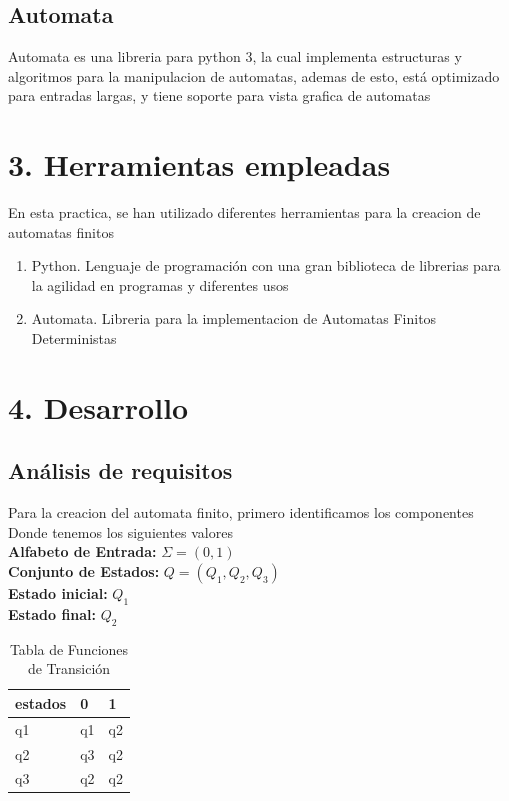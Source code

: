 \documentclass{article}
\begin{document}
    \subsection{Automata}
    Automata es una libreria para python 3, la cual implementa estructuras y algoritmos para la manipulacion de automatas, ademas de esto, está optimizado para entradas largas, y tiene soporte para vista grafica de automatas \cite{b4}
\section{3. Herramientas empleadas}
    En esta practica, se han utilizado diferentes herramientas para la creacion de automatas finitos
    \begin{enumerate}
        \item Python. Lenguaje de programación con una gran biblioteca de librerias para la agilidad en programas y diferentes usos \cite{b5}
        \item  Automata. Libreria para la implementacion de Automatas Finitos Deterministas \cite{b4}
    \end{enumerate}        
    \newpage
    
\section{4. Desarrollo}
    \subsection{Análisis de requisitos}
    Para la creacion del automata finito, primero identificamos los componentes \\
    Donde tenemos los siguientes valores \\
    \textbf{Alfabeto de Entrada:} \(\Sigma=(0,1)\) \\
    \textbf{Conjunto de Estados:} \(Q=(Q_1,Q_2,Q_3)\) \\
    \textbf{Estado inicial:} \(Q_1\)\\
    \textbf{Estado final:}  \(Q_2\)\\
    
        \begin{table}[!ht]
        \begin{center}
        \caption{Tabla de Funciones de Transición}
        \label{matriz1}
        
        \begin{tabular}{|l|l|l|}            
            \hline  
            estados& 0& 1\\
            \hline
            q1& q1& q2\\
            \hline
            q2& q3& q2\\
            \hline
            q3& q2& q2\\\hline          
        \end{tabular}
        \end{center}
        \end{table}
\end{document}
